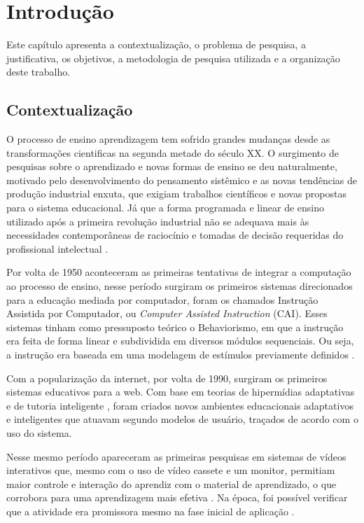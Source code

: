 \chapter[Introdução]{Introdução}

Este capítulo apresenta a contextualização, o problema de pesquisa, a justificativa,
os objetivos, a metodologia de pesquisa utilizada e a organização deste trabalho.

\section[Contextualização]{Contextualização}

O processo de ensino aprendizagem tem sofrido grandes mudanças desde as transformações cientificas na segunda metade do século XX. O surgimento de pesquisas sobre o aprendizado e novas formas de ensino se deu naturalmente, motivado pelo desenvolvimento do pensamento sistêmico e as novas tendências de produção industrial enxuta, que exigiam trabalhos científicos e novas propostas para o sistema educacional. Já que a forma programada e linear de ensino utilizado após a primeira revolução industrial não se adequava mais às necessidades contemporâneas de raciocínio e tomadas de decisão requeridas do profissional intelectual \cite{oliveira2009, frigotto1989}.

Por volta de 1950 aconteceram as primeiras tentativas de integrar a computação ao processo de ensino, nesse período surgiram os primeiros sistemas direcionados para a educação mediada por computador, foram os chamados Instrução Assistida por Computador, ou \textit{Computer Assisted Instruction} (CAI). Esses sistemas tinham como pressuposto teórico o Behaviorismo, em que a instrução era feita de forma linear e subdividida em diversos módulos sequenciais. Ou seja, a instrução era baseada em uma modelagem de estímulos previamente definidos \cite{giraffa1995,vicari2003}.

Com a popularização da internet, por volta de 1990, surgiram os primeiros sistemas educativos para a web. Com base em teorias de hipermídias adaptativas \cite{brusilovsky1996} e de tutoria inteligente \cite{brusilovsky1994}, foram criados novos ambientes educacionais adaptativos e inteligentes que atuavam segundo modelos de usuário, traçados de acordo com o uso do sistema.

Nesse mesmo período apareceram as primeiras pesquisas em sistemas de vídeos interativos que, mesmo com o uso de vídeo cassete e um monitor, permitiam maior controle e interação do aprendiz com o material de aprendizado, o que corrobora para uma aprendizagem mais efetiva \cite{zhang2005}. Na época, foi possível verificar que a atividade era promissora mesmo na fase inicial de aplicação \cite{gaudreau1984}.

